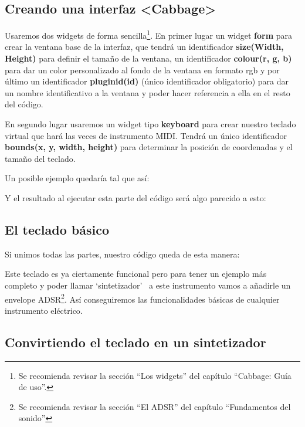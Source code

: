 \subsection{Creando una interfaz \textless Cabbage\textgreater}\label{sec:UISinte}

Usaremos dos widgets de forma sencilla\footnote{Se recomienda revisar la sección ``Los widgets'' del capítulo ``Cabbage: Guía de uso''.}. En primer lugar un widget \textbf{form} para crear la ventana base de la interfaz, que tendrá un identificador \textbf{size(Width, Height)} para definir el tamaño de la ventana, un identificador \textbf{colour(r, g, b)} para dar un color personalizado al fondo de la ventana en formato rgb y por último un identificador \textbf{pluginid(id)} (único identificador obligatorio) para dar un nombre identificativo a la ventana y poder hacer referencia a ella en el resto del código.

En segundo lugar usaremos un widget tipo \textbf{keyboard} para crear nuestro teclado virtual que hará las veces de instrumento MIDI. Tendrá un único identificador \textbf{bounds(x, y, width, height)} para determinar la posición de coordenadas y el tamaño del teclado.

Un posible ejemplo quedaría tal que así:

Y el resultado al ejecutar esta parte del código será algo parecido a esto:

 
\subsection{El teclado básico}\label{sec:SinteBasico}

Si unimos todas las partes, nuestro código queda de esta manera:


Este teclado es ya ciertamente funcional pero para tener un ejemplo más completo y poder llamar `sintetizador' \ a este instrumento vamos a añadirle un envelope ADSR\footnote{Se recomienda revisar la sección ``El ADSR'' del capítulo ``Fundamentos del sonido''}. Así conseguiremos las funcionalidades básicas de cualquier instrumento eléctrico.

\subsection{Convirtiendo el teclado en un sintetizador}\label{sec:SinteReal}

